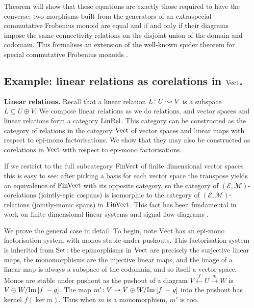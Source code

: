 Theorem will show that these equations are exactly those required to
have the converse: two morphisms built from the generators of an extraspecial
commutative Frobenius monoid are equal and if and only if their diagrams impose
the same connectivity relations on the disjoint union of the domain and
codomain. This formalises an extension of the well-known spider theorem for
special commutative Frobenius monoids \cite{CK,CPP}. 

\subsection{Example: linear relations as corelations in $\mathrm{Vect}$.}

\begin{example}
  \textbf{Linear relations.} 
  Recall that a linear relation $L{\colon} U \leadsto V$ is a subspace $L \subseteq
  U \oplus V$. We compose linear relations as we do relations, and vector spaces
  and linear relations form a category $\mathrm{LinRel}$. This category can be
  constructed as the category of relations in the category $\mathrm{Vect}$ of
  vector spaces and linear maps with respect to epi-mono factorisations. We show
  that they may also be constructed as corelations in $\mathrm{Vect}$ with respect to
  epi-mono factorisations.
  
  If we restrict to the full subcategory $\mathrm{FinVect}$ of finite dimensional vector
  spaces this is easy to see: after picking a basis for each vector space the
  transpose yields an equivalence of $\mathrm{FinVect}$ with its opposite category, so
  the category of $(\mathcal E,\mathcal M)$-corelations (jointly-epic cospans)
  is isomorphic to the category of $(\mathcal E,\mathcal M)$-relations
  (jointly-monic spans) in $\mathrm{FinVect}$. This fact has been fundamental in work on
  finite dimensional linear systems and signal flow diagrams \cite{BE,BSZ,FRS}.
  
  We prove the general case in detail. To begin, note $\mathrm{Vect}$ has an
  epi-mono factorisation system with monos stable under pushouts. This
  factorisation system is inherited from $\mathrm{Set}$: the epimorphisms in $\mathrm{Vect}$ are
  precisely the surjective linear maps, the monomorphisms are the injective
  linear maps, and the image of a linear map is always a subspace of the
  codomain, and so itself a vector space. Monos are stable under pushout as the
  pushout of a diagram $V \stackrel{f}{\leftarrow} U \stackrel{m}{\rightarrow}
  W$ is $V \oplus W/\mathrm{Im}\,[f\; -g]$. The map $m'{\colon} V \to V \oplus W/\mathrm{Im}\,[f\; -g]$
  into the pushout has kernel $f(\ker m)$. Thus when $m$ is a monomorphism, $m'$
  is too.
 

\end{example}
